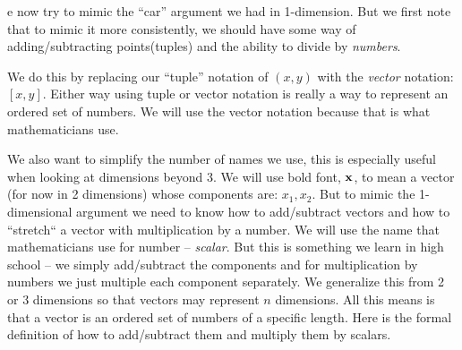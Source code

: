 \documentclass[12pt]{article}
\begin{document}
e now try to mimic the ``car'' argument we had in 1-dimension. But we first 
note that to mimic it more consistently, we should have some way of adding/subtracting
points(tuples) and the ability to divide by {\em numbers\/}.

We do this by replacing our ``tuple'' notation of $(x,y)$ with the {\em vector\/}
notation: $[x, y]$. Either way using tuple or vector notation is really
a way to represent an ordered set of numbers. We will use the vector notation
because that is what mathematicians use. 

We also want to simplify the number of names we use, this is especially useful
when looking at dimensions beyond 3. We will use bold font, ${\bf x}$, to mean 
a vector (for now in 2 dimensions) whose components are: $x_1, x_2$.
But to mimic the 1-dimensional argument
we need to know how to add/subtract vectors and how to ``stretch`` a vector with 
multiplication by a number. We will use the name that mathematicians use for number -- {\em scalar\/}.
But this is something we learn in high school -- we simply add/subtract the components 
and for multiplication by numbers we just multiple each component separately.
We generalize this from 2 or 3 dimensions so that vectors may represent $n$ dimensions.
All this means is that a vector is an ordered set of numbers of a specific length.
Here is the formal definition of how to add/subtract them and multiply them by scalars.
\end{document}
